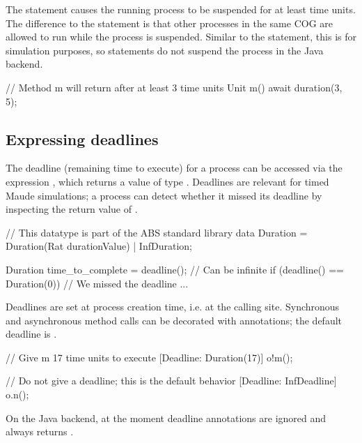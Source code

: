 The statement  causes the running
process to be suspended for at least  time units.  The
difference to the  statement is that other processes in
the same COG are allowed to run while the process is suspended.
Similar to the  statement, this is for simulation
purposes, so  statements do not suspend the
process in the Java backend.


\begin{absexample}
// Method m will return after at least 3 time units
Unit m() {
  await duration(3, 5);
}
\end{absexample}

\subsection{Expressing deadlines}

The deadline (remaining time to execute) for a process can be
accessed via the expression , which returns a value of
type .  Deadlines are relevant for timed Maude
simulations; a process can detect whether it missed its deadline by
inspecting the return value of .

\begin{absexample}
// This datatype is part of the ABS standard library
data Duration = Duration(Rat durationValue) | InfDuration;

Duration time_to_complete = deadline(); // Can be infinite
if (deadline() == Duration(0)) {    // We missed the deadline ...
}
\end{absexample}

Deadlines are set at process creation time, i.e. at the calling site.
Synchronous and asynchronous method calls can be decorated with
\absinline{[Deadline: e]} annotations; the default deadline is
.

\begin{absexample}
// Give m 17 time units to execute
[Deadline: Duration(17)] o!m();

// Do not give a deadline; this is the default behavior
[Deadline: InfDeadline] o.n();
\end{absexample}

On the Java backend, at the moment deadline annotations are ignored
and  always returns .
